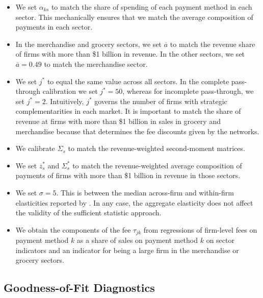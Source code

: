 \documentclass[11pt,english]{article}
\theoremstyle{remark}
\begin{document}
\begin{itemize}
\item We set $\alpha_{ks}$ to match the share of spending of each payment
method in each sector.
This mechanically ensures that we match the average composition of payments in each sector.

\item In the merchandise and grocery sectors, we set $\overline{a}$ to match the revenue share of firms with more than \$1 billion in revenue. In the other sectors, we set $\overline{a}=0.49$ to match the merchandise sector.
\item We set $j^*$ to equal the same value across all sectors. In the complete pass-through calibration we set $j^*=50$, whereas for incomplete pass-through, we set $j^*=2$. Intuitively, $j^*$ governs the number of firms with strategic complementarities in each market. It is important to match the share of revenue at firms with more than \$1 billion in sales in grocery and merchandise because that determines the fee discounts given by the networks.
\item We calibrate $\Sigma_{s}$ to match the revenue-weighted second-moment matrices.
\item We set $\overline{z}_{s}^{*}$ and $\Sigma_{s}^{*}$ to match the revenue-weighted average composition of payments of firms with more than \$1 billion in revenue in those sectors.
\item We set $\sigma=5$. This is between the median across-firm and within-firm elasticities reported by \citet{Hottman.etal2016}. In any case, the aggregate elasticity does not affect the validity of the sufficient statistic approach.
\item We obtain the components of the fee $\tau_{jk}$ from regressions of firm-level fees on payment method $k$ as a share of sales on payment method $k$ on sector indicators and an indicator for being a large firm in the merchandise or grocery sectors.
\end{itemize}

\subsection{Goodness-of-Fit Diagnostics}
\end{document}
